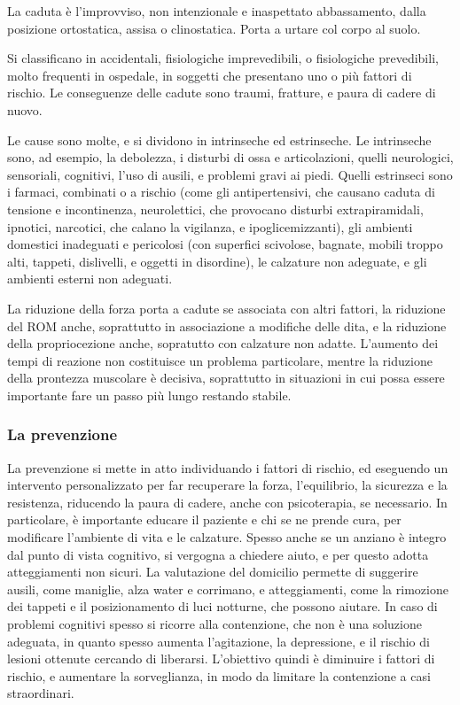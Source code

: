 La caduta è l'improvviso, non intenzionale e inaspettato abbassamento, dalla
posizione ortostatica, assisa o clinostatica. Porta a urtare col corpo al suolo.

Si classificano in accidentali, fisiologiche imprevedibili, o fisiologiche
prevedibili, molto frequenti in ospedale, in soggetti che presentano uno o più
fattori di rischio. Le conseguenze delle cadute sono traumi, fratture, e paura
di cadere di nuovo. 

Le cause sono molte, e si dividono in intrinseche ed estrinseche. Le intrinseche
sono, ad esempio, la debolezza, i disturbi di ossa e articolazioni, quelli
neurologici, sensoriali, cognitivi, l'uso di ausili, e problemi gravi ai piedi.
Quelli estrinseci sono i farmaci, combinati o a rischio (come gli
antipertensivi, che causano caduta di tensione e incontinenza, neurolettici, che
provocano disturbi extrapiramidali, ipnotici, narcotici, che calano la
vigilanza, e ipoglicemizzanti), gli ambienti domestici inadeguati e pericolosi
(con superfici scivolose, bagnate, mobili troppo alti, tappeti, dislivelli, e
oggetti in disordine), le calzature non adeguate, e gli ambienti esterni non
adeguati.

La riduzione della forza porta a cadute se associata con altri fattori, la
riduzione del ROM anche, soprattutto in associazione a modifiche delle dita,
e la riduzione della propriocezione anche, sopratutto con calzature non adatte.
L'aumento dei tempi di reazione non costituisce un problema particolare, mentre
la riduzione della prontezza muscolare è decisiva, soprattutto in situazioni in
cui possa essere importante fare un passo più lungo restando stabile.

\subsubsection{La prevenzione}
La prevenzione si mette in atto individuando i fattori di rischio, ed eseguendo
un intervento personalizzato per far recuperare la forza, l'equilibrio, la
sicurezza e la resistenza, riducendo la paura di cadere, anche con psicoterapia,
se necessario. In particolare, è importante educare il paziente e chi se ne
prende cura, per modificare l'ambiente di vita e le calzature. Spesso anche se
un anziano è integro dal punto di vista cognitivo, si vergogna a chiedere aiuto,
e per questo adotta atteggiamenti non sicuri. La valutazione del domicilio
permette di suggerire ausili, come maniglie, alza water e corrimano, e
atteggiamenti, come la rimozione dei tappeti e il posizionamento di luci
notturne, che possono aiutare.
In caso di problemi cognitivi spesso si ricorre alla contenzione, che non è una
soluzione adeguata, in quanto spesso aumenta l'agitazione, la depressione, e il
rischio di lesioni ottenute cercando di liberarsi. L'obiettivo quindi è
diminuire i fattori di rischio, e aumentare la sorveglianza, in modo da limitare
la contenzione a casi straordinari.

